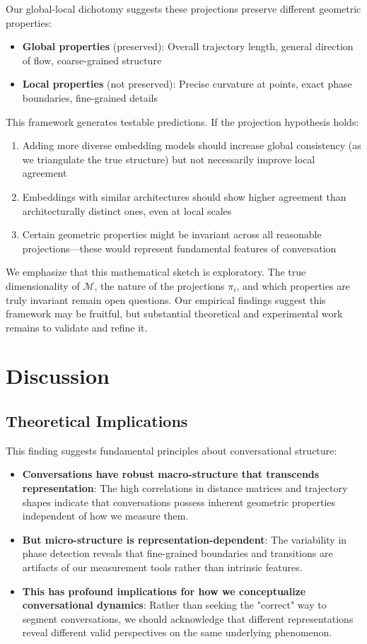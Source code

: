 \documentclass[11pt,letterpaper]{article}
\begin{document}
Our global-local dichotomy suggests these projections preserve different geometric properties:
\begin{itemize}
\item \textbf{Global properties} (preserved): Overall trajectory length, general direction of flow, coarse-grained structure
\item \textbf{Local properties} (not preserved): Precise curvature at points, exact phase boundaries, fine-grained details
\end{itemize}

This framework generates testable predictions. If the projection hypothesis holds:
\begin{enumerate}
\item Adding more diverse embedding models should increase global consistency (as we triangulate the true structure) but not necessarily improve local agreement
\item Embeddings with similar architectures should show higher agreement than architecturally distinct ones, even at local scales
\item Certain geometric properties might be invariant across all reasonable projections—these would represent fundamental features of conversation
\end{enumerate}

We emphasize that this mathematical sketch is exploratory. The true dimensionality of $\mathcal{M}$, the nature of the projections $\pi_i$, and which properties are truly invariant remain open questions. Our empirical findings suggest this framework may be fruitful, but substantial theoretical and experimental work remains to validate and refine it.

\section{Discussion}

\subsection{Theoretical Implications}

This finding suggests fundamental principles about conversational structure:
\begin{itemize}
\item \textbf{Conversations have robust macro-structure that transcends representation}: The high correlations in distance matrices and trajectory shapes indicate that conversations possess inherent geometric properties independent of how we measure them.
\item \textbf{But micro-structure is representation-dependent}: The variability in phase detection reveals that fine-grained boundaries and transitions are artifacts of our measurement tools rather than intrinsic features.
\item \textbf{This has profound implications for how we conceptualize conversational dynamics}: Rather than seeking the "correct" way to segment conversations, we should acknowledge that different representations reveal different valid perspectives on the same underlying phenomenon.
\end{itemize}
\end{document}
